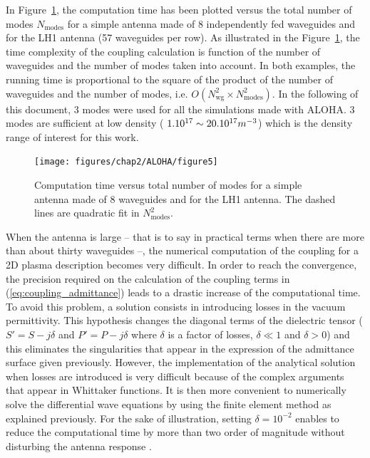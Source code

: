 In Figure~\ref{fig:Computation-time-versus-modes}, the computation time has been plotted versus the total number of modes $N_{\mbox{modes}}$ for a simple antenna made of 8 independently fed waveguides and for the LH1 antenna (57 waveguides per row). As illustrated in the Figure~\ref{fig:Computation-time-versus-modes}, the time complexity of the coupling calculation is function of the number of waveguides and the number of modes taken into account. In both examples, the running time is proportional to the square of the product of the number of waveguides and the number of modes, i.e. $O\left(N_{\mbox{wg}}^{2}\times N_{\mbox{modes}}^{2}\right)$. In the following of this document, 3 modes were used for all the simulations made with ALOHA. 3 modes are sufficient at low density ( $1.10^{17}\sim20.10^{17}\mbox{\ensuremath{m^{-3}}}$)
which is the density range of interest for this work.

%
\begin{figure}[h]
	\texttt{[image: figures/chap2/ALOHA/figure5]}
	\caption{Computation time versus total number of modes for a simple antenna
		made of 8 waveguides and for the LH1 antenna. The dashed lines are
		quadratic fit in $N_{\mbox{modes}}^{2}$. \label{fig:Computation-time-versus-modes}}
\end{figure}


When the antenna is large -- that is to say in practical terms when there are more than about thirty waveguides --, the numerical computation of the coupling for a 2D plasma description becomes very difficult. In order to reach the convergence, the precision required on the calculation of the coupling terms in (\ref{eq:coupling_admittance}) leads to a drastic increase of the computational time. To avoid this problem, a solution consists in introducing losses in the vacuum permittivity. This hypothesis changes the diagonal terms of the dielectric tensor ($S'=S-j\delta$ and $P'=P-j\delta$ where $\delta$ is a factor of losses, $\delta\ll1$ and $\delta>0$) and this eliminates the singularities that appear in the expression of the admittance surface given previously. However, the implementation of the analytical solution when losses are introduced is very difficult because of the complex arguments that appear in Whittaker functions. It is then more convenient to numerically solve the differential wave equations by using the finite element method as explained previously. For the sake of illustration, setting $\delta=10^{-2}$ enables to reduce the computational time by more than two order of magnitude without disturbing the antenna response .


